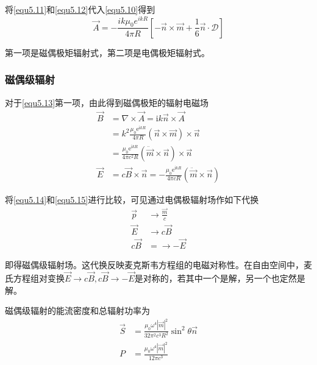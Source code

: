 \documentclass[UTF8]{ctexart}
\begin{document}
    将\autoref{equ5.11}和\autoref{equ5.12}代入\autoref{equ5.10}得到
    \begin{equation}
        \vec{A} = - \frac{i k \mu_0 e^{ik R}}{4 \pi R} \left[- \vec{n} \times \vec{m} + \frac{1}{6} \vec{n} \cdot \mathbf{\mathscr{D}}\right]\label{equ5.13}
    \end{equation}
    
\noindent 第一项是磁偶极矩辐射式，第二项是电偶极矩辐射式。

    \subsubsection{磁偶级辐射}
    对于\autoref{equ5.13}第一项，由此得到磁偶极矩的辐射电磁场
    \begin{equation}
    \begin{aligned} \vec{B} &=\nabla \times \vec{A}=\mathrm{i} k \vec{n} \times \vec{A} \\ &=k^{2} \frac{\mu_{0} \mathrm{e}^{\mathrm{i} k R}}{4 \pi R}(\vec{n} \times \vec{m}) \times \vec{n} \\ &=\frac{\mu_{0} \mathrm{e}^{\mathrm{i} k R}}{4 \pi c^{2} R}(\ddot{\vec{m}} \times \vec{n}) \times \vec{n} \\ \vec{E} &=c \vec{B} \times \vec{n}=-\frac{\mu_{0} \mathrm{e}^{\mathrm{i} k R}}{4 \pi c R}(\ddot{\vec{m}} \times \vec{n}) \end{aligned}\label{equ5.15}
    \end{equation}

\noindent 将\autoref{equ5.14}和\autoref{equ5.15}进行比较，可见通过电偶极辐射场作如下代换
\begin{equation}
    \begin{aligned}
        \vec{p} &\to \frac{\vec{m}}{c} \\
        \vec{E} & \to c \vec{B} \\ 
        c\vec{B} &= \to - \vec{E}
    \end{aligned}
\end{equation}

\noindent 即得磁偶级辐射场。这代换反映麦克斯韦方程组的电磁对称性。在自由空间中，麦氏方程组对变换$\vec{E} \to c \vec{B},c \vec{B} \to - \vec{E}$是对称的，若其中一个是解，另一个也定然是解。

    磁偶级辐射的能流密度和总辐射功率为
    \begin{equation}
        \begin{aligned}
            \vec{S} &= \frac{\mu_0 \omega^4 |\vec{m}|^2}{32 \pi^2 c^3 R^2} \sin^2 \theta \vec{n} \\
            P &= \frac{\mu_0 \omega^4 |\vec{m}|^2}{12 \pi c^3}
        \end{aligned}
    \end{equation}
\end{document}
